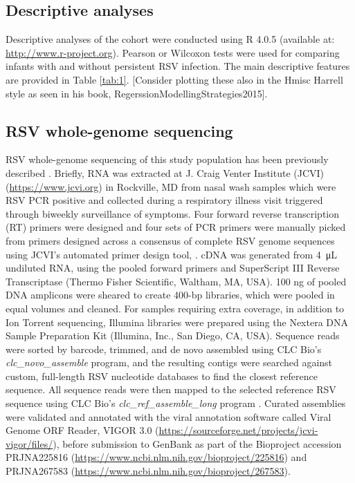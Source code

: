 \documentclass{article}
\begin{document}
\subsection{Descriptive analyses}
Descriptive analyses of the cohort were conducted using R 4.0.5 (available at: 
\url{http://www.r-project.org}). 
Pearson or Wilcoxon tests were used for comparing infants with and without persistent RSV infection.
The main descriptive features are provided in 
Table \ref{tab:1}.
[Consider plotting these also in the Hmisc Harrell style as seen in his book, RegerssionModellingStrategies2015].

\subsection{RSV whole-genome sequencing}
RSV whole-genome sequencing of this study population has been previously described 
\cite{schobel_respiratory_2016}.
Briefly, RNA was extracted at J. Craig Venter Institute (JCVI) (\url{https://www.jcvi.org}) in Rockville, MD from nasal wash samples which were RSV PCR positive and collected during a respiratory illness visit triggered through biweekly surveillance of symptoms. 
Four forward reverse transcription (RT) primers were designed and four sets of PCR primers were manually picked from primers designed across a consensus of complete RSV genome sequences using JCVI’s automated primer design tool,
\cite{li_automated_2012}.
cDNA was generated from \SI{4}{\micro\liter}  undiluted RNA, using the pooled forward primers and SuperScript III Reverse Transcriptase (Thermo Fisher Scientific, Waltham, MA, USA). 
100 ng of pooled DNA amplicons were sheared to create 400-bp libraries, which were pooled in equal volumes and cleaned. 
For samples requiring extra coverage, in addition to Ion Torrent sequencing, Illumina libraries were prepared using the Nextera DNA Sample Preparation Kit (Illumina, Inc., San Diego, CA, USA). 
Sequence reads were sorted by barcode, trimmed, and de novo assembled using CLC Bio's \textit{clc\_novo\_assemble} program, and the resulting contigs were searched against custom, full-length RSV nucleotide databases to find the closest reference sequence. 
All sequence reads were then mapped to the selected reference RSV sequence using CLC Bio's \textit{clc\_ref\_assemble\_long} program 
\cite{bioWhite2016}.
Curated assemblies were validated and annotated with the viral annotation software called Viral Genome ORF Reader, VIGOR 3.0 (\url{https://sourceforge.net/projects/jcvi-vigor/files/}), before submission to GenBank as part of the Bioproject accession PRJNA225816 (\url{https://www.ncbi.nlm.nih.gov/bioproject/225816})
\cite{wang_vigor_2012} 
and PRJNA267583 (\url{https://www.ncbi.nlm.nih.gov/bioproject/267583}).
\end{document}
